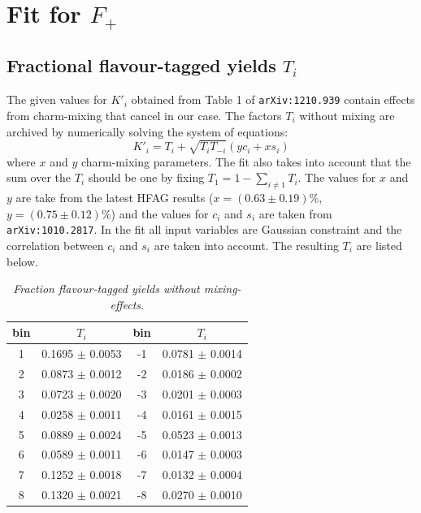\chapter{Fit for $F_{+}$}

\section{Fractional flavour-tagged \KsPiPi yields $T_i$}
The given values for $K'_i$ obtained from Table 1 of \texttt{arXiv:1210.939} contain effects from charm-mixing that cancel in our case. The factors $T_i$ without mixing are archived by numerically solving the system of equations:
\begin{equation}
K'_i = T_i + \sqrt{T_i T_{-i}} (y c_i + x s_i)
\end{equation}
where $x$ and $y$ charm-mixing parameters. The fit also takes into account that the sum over the $T_i$ should be one by fixing  $T_1 = 1 - \sum_{i \neq 1} T_i$. The values for $x$ and $y$ are take from the latest HFAG results ($x = (0.63 \pm 0.19)\%$, $y = (0.75 \pm 0.12)\% $) and the values for $c_i$ and $s_i$ are taken from \texttt{arXiv:1010.2817}. In the fit all input variables are Gaussian constraint and the correlation between $c_i$ and $s_i$ are taken into account. The resulting $T_i$ are listed below.\\
\begin{table}[!h]
	\begin{center}
		\begin{tabular}{c| c | c |c }
			bin & $T_i$ & bin & $T_i$ \\
			\hline
			1 & 0.1695 $\pm $ 0.0053 \qquad & -1 & 0.0781 $\pm$ 0.0014 \\
			2 & 0.0873 $\pm $ 0.0012 \qquad & -2 & 0.0186 $\pm$ 0.0002 \\
			3 & 0.0723 $\pm $ 0.0020 \qquad & -3 & 0.0201 $\pm$ 0.0003 \\
			4 & 0.0258 $\pm $ 0.0011 \qquad & -4 & 0.0161 $\pm$ 0.0015 \\
			5 & 0.0889 $\pm $ 0.0024 \qquad & -5 & 0.0523 $\pm$ 0.0013 \\
			6 & 0.0589 $\pm $ 0.0011 \qquad & -6 & 0.0147 $\pm$ 0.0003 \\
			7 & 0.1252 $\pm $ 0.0018 \qquad & -7 & 0.0132 $\pm$ 0.0004 \\
			8 & 0.1320 $\pm $ 0.0021 \qquad & -8 & 0.0270 $\pm$ 0.0010 \\
			\end{tabular}
\end{center}
\caption{\textit{Fraction flavour-tagged \KsPiPi yields without mixing-effects.}}
\end{table} 
\clearpage
